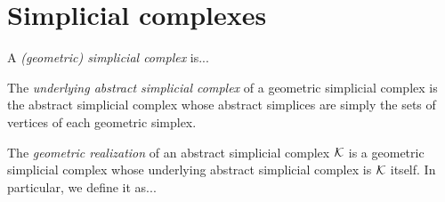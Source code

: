 \section{Simplicial complexes}
\label{sec:simplicial_complex}

\begin{definition} %
    A \emph{(geometric) simplicial complex} is... 
\end{definition}

\begin{definition}
    The \emph{underlying abstract simplicial complex} of a geometric simplicial complex is the abstract simplicial complex whose abstract simplices are simply the sets of vertices of each geometric simplex.
\end{definition}

\begin{definition}\label{def:geometric_realization}
    The \emph{geometric realization} of an abstract simplicial complex $\mathcal{K}$ is a geometric simplicial complex whose underlying abstract simplicial complex is $\mathcal{K}$ itself. In particular, we define it as...
\end{definition}